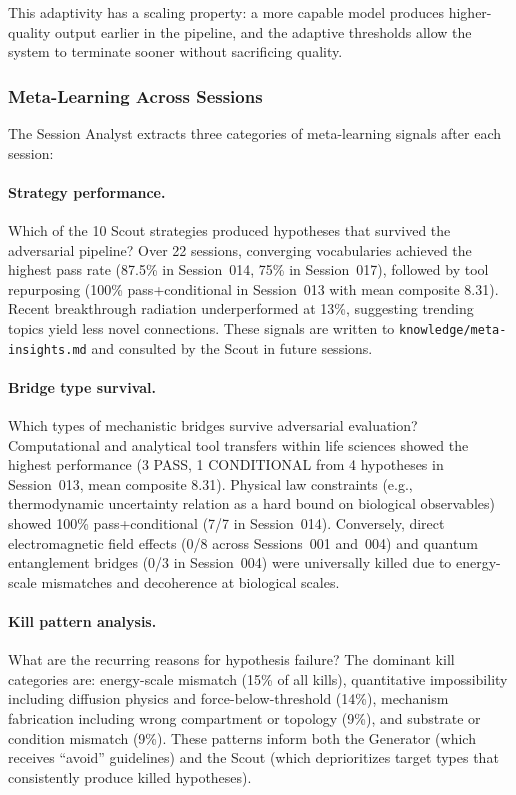 This adaptivity has a scaling property: a more capable model produces higher-quality output earlier in the pipeline, and the adaptive thresholds allow the system to terminate sooner without sacrificing quality.

\subsubsection{Meta-Learning Across Sessions}

The Session Analyst extracts three categories of meta-learning signals after each session:

\paragraph{Strategy performance.} Which of the 10 Scout strategies produced hypotheses that survived the adversarial pipeline? Over 22 sessions, converging vocabularies achieved the highest pass rate (87.5\% in Session~014, 75\% in Session~017), followed by tool repurposing (100\% pass+conditional in Session~013 with mean composite 8.31). Recent breakthrough radiation underperformed at 13\%, suggesting trending topics yield less novel connections. These signals are written to \texttt{knowledge/\allowbreak{}meta-insights.md} and consulted by the Scout in future sessions.

\paragraph{Bridge type survival.} Which types of mechanistic bridges survive adversarial evaluation? Computational and analytical tool transfers within life sciences showed the highest performance (3 PASS, 1 CONDITIONAL from 4 hypotheses in Session~013, mean composite 8.31). Physical law constraints (e.g., thermodynamic uncertainty relation as a hard bound on biological observables) showed 100\% pass+conditional (7/7 in Session~014). Conversely, direct electromagnetic field effects (0/8 across Sessions~001 and~004) and quantum entanglement bridges (0/3 in Session~004) were universally killed due to energy-scale mismatches and decoherence at biological scales.

\paragraph{Kill pattern analysis.} What are the recurring reasons for hypothesis failure? The dominant kill categories are: energy-scale mismatch (15\% of all kills), quantitative impossibility including diffusion physics and force-below-threshold (14\%), mechanism fabrication including wrong compartment or topology (9\%), and substrate or condition mismatch (9\%). These patterns inform both the Generator (which receives ``avoid'' guidelines) and the Scout (which deprioritizes target types that consistently produce killed hypotheses).

